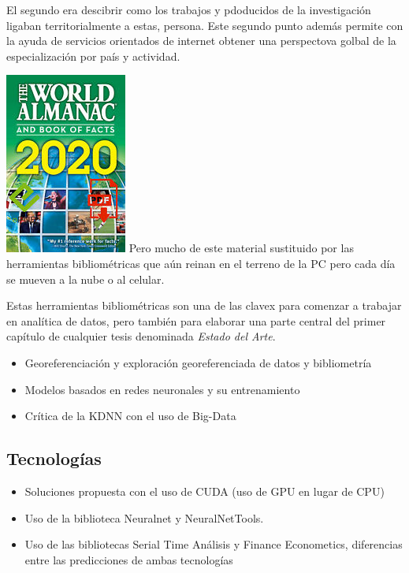 \documentclass[]{article}
\providecommand{\tightlist}{%
  \setlength{\itemsep}{0pt}\setlength{\parskip}{0pt}}
\begin{document}
El segundo era descibrir como los trabajos y pdoducidos de la
investigación ligaban territorialmente a estas, persona. Este segundo
punto además permite con la ayuda de servicios orientados de internet
obtener una perspectova golbal de la especialización por país y
actividad.

\includegraphics{almanaque.jpg} Pero mucho de este material sustituido
por las herramientas bibliométricas que aún reinan en el terreno de la
PC pero cada día se mueven a la nube o al celular.

Estas herramientas bibliométricas son una de las clavex para comenzar a
trabajar en analítica de datos, pero también para elaborar una parte
central del primer capítulo de cualquier tesis denominada \emph{Estado
del Arte}.

\begin{itemize}
\tightlist
\item
  Georeferenciación y exploración georeferenciada de datos y
  bibliometría
\item
  Modelos basados en redes neuronales y su entrenamiento
\item
  Crítica de la KDNN con el uso de Big-Data
\end{itemize}

\subsection{Tecnologías}\label{tecnologuxedas}

\begin{itemize}
\tightlist
\item
  Soluciones propuesta con el uso de CUDA (uso de GPU en lugar de CPU)
\item
  Uso de la biblioteca Neuralnet y NeuralNetTools.
\item
  Uso de las bibliotecas Serial Time Análisis y Finance Econometics,
  diferencias entre las predicciones de ambas tecnologías
\end{itemize}
\end{document}
